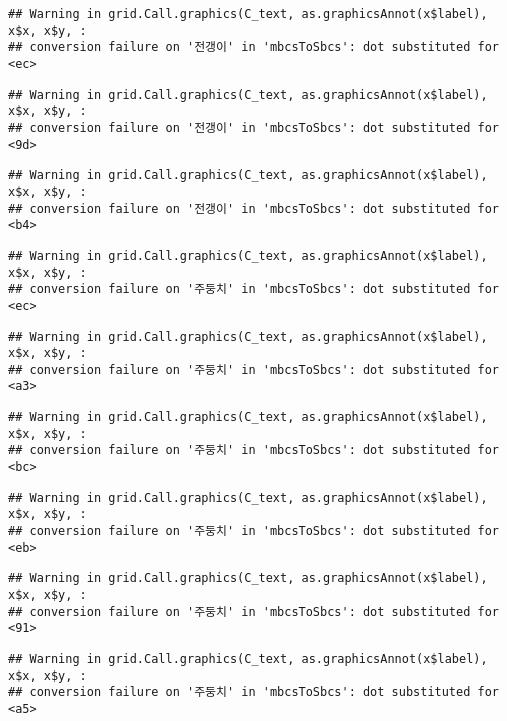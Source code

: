 \documentclass[
]{article}
\begin{document}
\begin{verbatim}
## Warning in grid.Call.graphics(C_text, as.graphicsAnnot(x$label), x$x, x$y, :
## conversion failure on '전갱이' in 'mbcsToSbcs': dot substituted for <ec>
\end{verbatim}

\begin{verbatim}
## Warning in grid.Call.graphics(C_text, as.graphicsAnnot(x$label), x$x, x$y, :
## conversion failure on '전갱이' in 'mbcsToSbcs': dot substituted for <9d>
\end{verbatim}

\begin{verbatim}
## Warning in grid.Call.graphics(C_text, as.graphicsAnnot(x$label), x$x, x$y, :
## conversion failure on '전갱이' in 'mbcsToSbcs': dot substituted for <b4>
\end{verbatim}

\begin{verbatim}
## Warning in grid.Call.graphics(C_text, as.graphicsAnnot(x$label), x$x, x$y, :
## conversion failure on '주둥치' in 'mbcsToSbcs': dot substituted for <ec>
\end{verbatim}

\begin{verbatim}
## Warning in grid.Call.graphics(C_text, as.graphicsAnnot(x$label), x$x, x$y, :
## conversion failure on '주둥치' in 'mbcsToSbcs': dot substituted for <a3>
\end{verbatim}

\begin{verbatim}
## Warning in grid.Call.graphics(C_text, as.graphicsAnnot(x$label), x$x, x$y, :
## conversion failure on '주둥치' in 'mbcsToSbcs': dot substituted for <bc>
\end{verbatim}

\begin{verbatim}
## Warning in grid.Call.graphics(C_text, as.graphicsAnnot(x$label), x$x, x$y, :
## conversion failure on '주둥치' in 'mbcsToSbcs': dot substituted for <eb>
\end{verbatim}

\begin{verbatim}
## Warning in grid.Call.graphics(C_text, as.graphicsAnnot(x$label), x$x, x$y, :
## conversion failure on '주둥치' in 'mbcsToSbcs': dot substituted for <91>
\end{verbatim}

\begin{verbatim}
## Warning in grid.Call.graphics(C_text, as.graphicsAnnot(x$label), x$x, x$y, :
## conversion failure on '주둥치' in 'mbcsToSbcs': dot substituted for <a5>
\end{verbatim}
\end{document}
